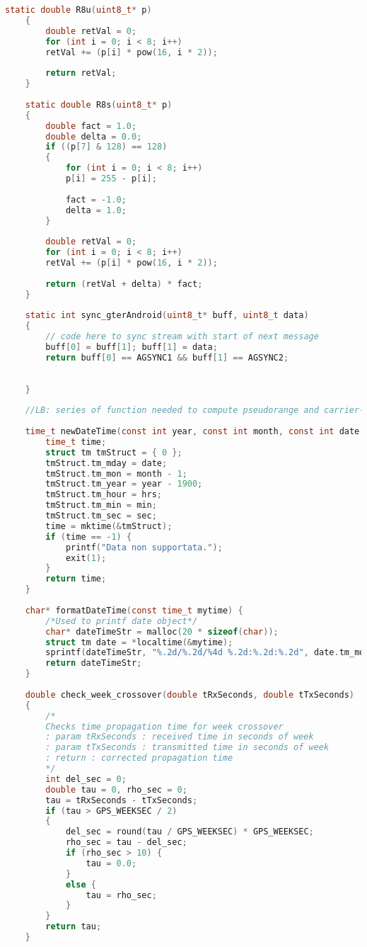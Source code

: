 \begin{lstlisting}[language=c]
	static double R8u(uint8_t* p)
	{
		double retVal = 0;
		for (int i = 0; i < 8; i++)
		retVal += (p[i] * pow(16, i * 2));
		
		return retVal;
	}
	
	static double R8s(uint8_t* p)
	{
		double fact = 1.0;
		double delta = 0.0;
		if ((p[7] & 128) == 128)
		{
			for (int i = 0; i < 8; i++)
			p[i] = 255 - p[i];
			
			fact = -1.0;
			delta = 1.0;
		}
		
		double retVal = 0;
		for (int i = 0; i < 8; i++)
		retVal += (p[i] * pow(16, i * 2));
		
		return (retVal + delta) * fact;
	}
	
	static int sync_gterAndroid(uint8_t* buff, uint8_t data)
	{
		// code here to sync stream with start of next message
		buff[0] = buff[1]; buff[1] = data;
		return buff[0] == AGSYNC1 && buff[1] == AGSYNC2;
		
		
	}
	
	//LB: series of function needed to compute pseudorange and carrier-phase observation
	
	time_t newDateTime(const int year, const int month, const int date, const int hrs, const int min, const int sec) {
		time_t time;
		struct tm tmStruct = { 0 };
		tmStruct.tm_mday = date;
		tmStruct.tm_mon = month - 1;
		tmStruct.tm_year = year - 1900;
		tmStruct.tm_hour = hrs;
		tmStruct.tm_min = min;
		tmStruct.tm_sec = sec;
		time = mktime(&tmStruct);
		if (time == -1) {
			printf("Data non supportata.");
			exit(1);
		}
		return time;
	}
	
	char* formatDateTime(const time_t mytime) {
		/*Used to printf date object*/
		char* dateTimeStr = malloc(20 * sizeof(char));
		struct tm date = *localtime(&mytime);
		sprintf(dateTimeStr, "%.2d/%.2d/%4d %.2d:%.2d:%.2d", date.tm_mday, date.tm_mon + 1, date.tm_year + 1900, date.tm_hour, date.tm_min, date.tm_sec);
		return dateTimeStr;
	}
	
	double check_week_crossover(double tRxSeconds, double tTxSeconds)
	{
		/*
		Checks time propagation time for week crossover
		: param tRxSeconds : received time in seconds of week
		: param tTxSeconds : transmitted time in seconds of week
		: return : corrected propagation time
		*/
		int del_sec = 0;
		double tau = 0, rho_sec = 0;
		tau = tRxSeconds - tTxSeconds;
		if (tau > GPS_WEEKSEC / 2)
		{
			del_sec = round(tau / GPS_WEEKSEC) * GPS_WEEKSEC;
			rho_sec = tau - del_sec;
			if (rho_sec > 10) {
				tau = 0.0;
			}
			else {
				tau = rho_sec;
			}
		}
		return tau;
	}
	

\end{lstlisting}
